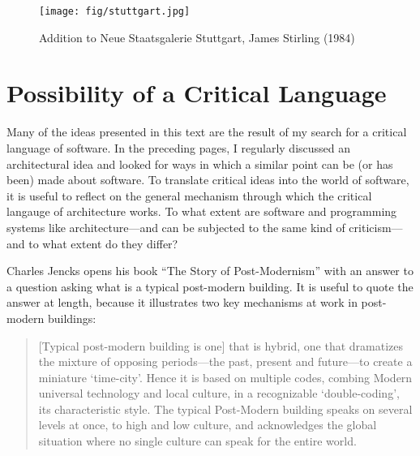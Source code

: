 \begin{figure}
\centering
\vspace{-1em}
\texttt{[image: fig/stuttgart.jpg]}
\caption{Addition to Neue Staatsgalerie Stuttgart, James Stirling (1984)}
\label{fig:stuttgart}
\end{figure}

\section{Possibility of a Critical Language}

Many of the ideas presented in this text are the result of my search for a critical
language of software. In the preceding pages, I regularly discussed an architectural idea and
looked for ways in which a similar point can be (or has been) made about software. To translate
critical ideas into the world of software, it is useful to reflect on the general mechanism
through which the critical langauge of architecture works. To what extent are software and
programming systems like architecture---and can be subjected to the
same kind of criticism---and to what extent do they differ?

Charles Jencks opens his book ``The Story of Post-Modernism'' with an answer to
a question asking what is a typical post-modern building. It is useful to quote the answer at length,
because it illustrates two key mechanisms at work in post-modern buildings:

\begin{quote}
[Typical post-modern building is one]
that is hybrid, one that dramatizes the mixture of opposing periods---the past, present and
future---to create a miniature `time-city'. Hence it is based on multiple codes, combing Modern
universal technology and local culture, in a recognizable `double-coding', its characteristic
style. The typical Post-Modern building speaks on several levels at once, to high and low culture,
and acknowledges the global situation where no single culture can speak for the entire world.
\end{quote}

